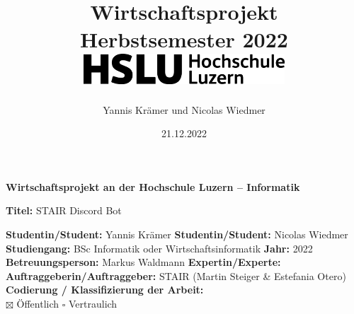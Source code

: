 \documentclass[a4paper, table]{article}
\title{
    {Wirtschaftsprojekt} \\
    \vspace{10mm}
    { Herbstsemester 2022 } \\
    \vspace{10mm}
    {\includegraphics[width=75mm]{img/hsluLogo2022.png}}
}
\author{Yannis Kr\"amer und Nicolas Wiedmer}
\date{21.12.2022}
\begin{document}
\maketitle

\clearpairofpagestyles
{}
\ohead{\leftmark}
\cfoot*{\pagemark}
\renewcommand*\thispagestyle{scrheadings}%

\newpage

\noindent
\fontsize{12}{14}
\textbf{Wirtschaftsprojekt an der Hochschule Luzern -- Informatik} \\ \vspace*{0.6cm}

\fontsize{10.95}{12}
\noindent
\textbf{Titel:} STAIR Discord Bot \\ \vspace*{0.2cm}

\noindent
\textbf{Studentin/Student:} Yannis Kr\"amer \newline \newline
\textbf{Studentin/Student:} Nicolas Wiedmer \newline \newline
\textbf{Studiengang:} BSc Informatik oder Wirtschaftsinformatik  \newline \newline
\textbf{Jahr:} 2022 \newline \newline
\textbf{Betreuungsperson:} Markus Waldmann \newline \newline
\textbf{Expertin/Experte:} \newline \newline
\textbf{Auftraggeberin/Auftraggeber:} STAIR (Martin Steiger \& Estefania Otero)\newline \newline \newline
\textbf{Codierung / Klassifizierung der Arbeit:}\\
$\boxtimes$ \"Offentlich
$\square$ Vertraulich


\end{document}
